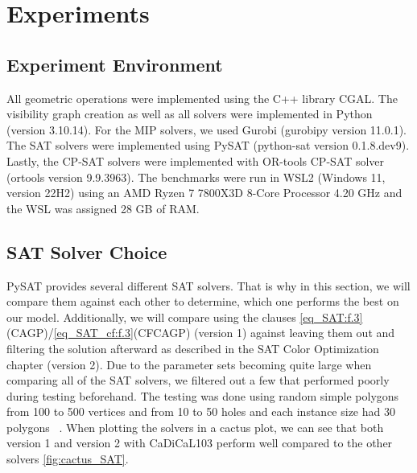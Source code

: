 \chapter{Experiments}
\section{Experiment Environment}
All geometric operations were implemented using the C++ library CGAL. The visibility graph creation as well as all solvers were implemented in Python (version 3.10.14). For the MIP solvers, we used Gurobi (gurobipy version 11.0.1). The SAT solvers were implemented using PySAT (python-sat version 0.1.8.dev9). Lastly, the CP-SAT solvers were implemented with OR-tools CP-SAT solver (ortools version 9.9.3963).
The benchmarks were run in WSL2 (Windows 11, version 22H2) using an AMD Ryzen 7 7800X3D 8-Core Processor 4.20 GHz and the WSL was assigned 28 GB of RAM.

\section{SAT Solver Choice}
PySAT provides several different SAT solvers. That is why in this section, we will compare them against each other to determine, which one performs the best on our model. Additionally, we will compare using the clauses \cref{eq_SAT:f.3}(CAGP)/\cref{eq_SAT_cf:f.3}(CFCAGP) (version 1) against leaving them out and filtering the solution afterward as described in the SAT Color Optimization chapter (version 2). Due to the parameter sets becoming quite large when comparing all of the SAT solvers, we filtered out a few that performed poorly during testing beforehand. The testing was done using random simple polygons from 100 to 500 vertices and from 10 to 50 holes and each instance size had 30 polygons ~\cite{art-gallery-unicamp-page}. When plotting the solvers in a cactus plot, we can see that both version 1 and version 2 with CaDiCaL103 perform well compared to the other solvers \cref{fig:cactus_SAT}.


